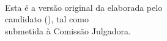 %
%
%
\newpage
\thispagestyle{empty}
    \begin{center}
        \vspace*{2.3 cm}
        \textbf{\Large{\titulotrabalho}}\\
        \vspace*{2 cm}
    \end{center}

    \vskip 2cm

    \begin{flushright}
	Esta é a versão original da \MakeLowercase{\tipotrabalho} elaborada pelo\\
	candidato (\autor), tal como \\
	submetida à Comissão Julgadora.
    \end{flushright}

\pagebreak

